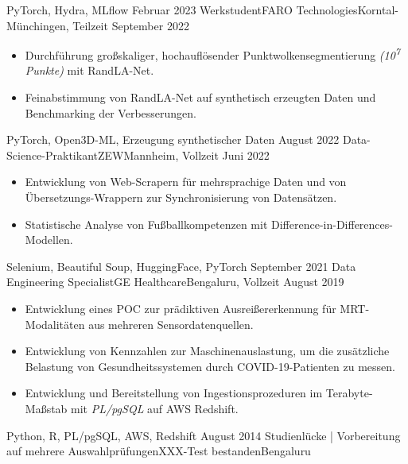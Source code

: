 \begin{experiences}
{\begin{itemize}
      \end{itemize}
    }
    {PyTorch, Hydra, MLflow}
  \emptySeparator
  \experience
    {Februar 2023} {Werkstudent}{FARO Technologies}{Korntal-Münchingen, Teilzeit}
    {September 2022} {
      \begin{itemize}
        \item{Durchführung großskaliger, hochauflösender Punktwolkensegmentierung \textit{(10\textsuperscript{7} Punkte)} mit RandLA-Net.}
        \item{Feinabstimmung von RandLA-Net auf synthetisch erzeugten Daten und Benchmarking der Verbesserungen.}
      \end{itemize}
    }
    {PyTorch, Open3D-ML, Erzeugung synthetischer Daten}
  \emptySeparator
  \experience
    {August 2022} {Data-Science-Praktikant}{ZEW}{Mannheim, Vollzeit}
    {Juni 2022} {
      \begin{itemize}
        \item{Entwicklung von Web-Scrapern für mehrsprachige Daten und von Übersetzungs-Wrappern zur Synchronisierung von Datensätzen.}
        \item{Statistische Analyse von Fußballkompetenzen mit Difference-in-Differences-Modellen.}
      \end{itemize}
    }
    {Selenium, Beautiful Soup, HuggingFace, PyTorch}
  \emptySeparator
  \experience
    {September 2021} {Data Engineering Specialist}{GE Healthcare}{Bengaluru, Vollzeit}
    {August 2019} {
      \begin{itemize}
        \item{Entwicklung eines POC zur prädiktiven Ausreißererkennung für MRT-Modalitäten aus mehreren Sensordatenquellen.}
        \item{Entwicklung von Kennzahlen zur Maschinenauslastung, um die zusätzliche Belastung von Gesundheitssystemen durch COVID-19-Patienten zu messen.}
        \item{Entwicklung und Bereitstellung von Ingestionsprozeduren im Terabyte-Maßstab mit \textit{PL/pgSQL} auf AWS Redshift.}
      \end{itemize}
    }
    {Python, R, PL/pgSQL, AWS, Redshift}
  \emptySeparator
  \iffalse
  \experience
    {August 2014} {Studienlücke | Vorbereitung auf mehrere Auswahlprüfungen}{XXX-Test bestanden}{Bengaluru}

\end{experiences}
